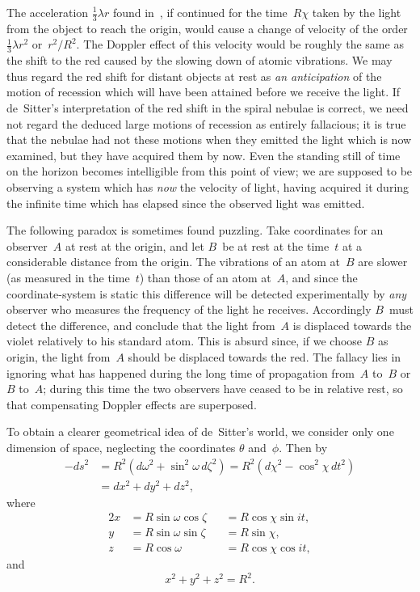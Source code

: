 \documentclass[12pt]{book}
\begin{document}
The acceleration $\frac{1}{3}\lambda r$ found in~, if continued for the time~$R\chi$ taken
by the light from the object to reach the origin, would cause a change of
velocity of the order $\frac{1}{3}\lambda r^{2}$ or~$r^{2}/R^{2}$. The Doppler effect of this velocity would
be roughly the same as the shift to the red caused by the slowing down of
atomic vibrations. We may thus regard the red shift for distant objects at
rest as \emph{an anticipation} of the motion of recession which will have been attained
before we receive the light. If de~Sitter's interpretation of the red shift in
the spiral nebulae is correct, we need not regard the deduced large motions
of recession as entirely fallacious; it is true that the nebulae had not these
motions when they emitted the light which is now examined, but they have
acquired them by now. Even the standing still of time on the horizon becomes
intelligible from this point of view; we are supposed to be observing a system
which has \emph{now} the velocity of light, having acquired it during the infinite
time which has elapsed since the observed light was emitted.

The following paradox is sometimes found puzzling. Take coordinates for
an observer~$A$ at rest at the origin, and let $B$~be at rest at the time~$t$ at a
considerable distance from the origin. The vibrations of an atom at~$B$ are
slower (as measured in the time~$t$) than those of an atom at~$A$, and since the
coordinate\hyp{}system is static this difference will be detected experimentally by
\emph{any} observer who measures the frequency of the light he receives. Accordingly
$B$~must detect the difference, and conclude that the light from~$A$ is displaced
towards the violet relatively to his standard atom. This is absurd since, if we
choose $B$ as origin, the light from~$A$ should be displaced towards the red. The
fallacy lies in ignoring what has happened during the long time of propagation
from~$A$ to~$B$ or $B$ to~$A$; during this time the two observers have ceased
to be in relative rest, so that compensating Doppler effects are superposed.

To obtain a clearer geometrical idea of de~Sitter's world, we consider only
one dimension of space, neglecting the coordinates $\theta$ and~$\phi$. Then by~
\begin{align*}
  -ds^{2} &= R^{2} (d\omega^2 + \sin^{2}\omega\, d\zeta^2)
  = R^{2} (d\chi^{2} - \cos^{2}\chi\, dt^{2}) \\
  &= dx^{2} + dy^{2} + dz^{2},
\end{align*}
where
\begin{alignat*}{2}
  x &= R\sin\omega \cos\zeta &&= R\cos\chi \sin it, \\
  y &= R\sin\omega \sin\zeta &&= R\sin\chi, \\
  z &= R\cos\omega &&= R\cos\chi \cos it,
\end{alignat*}
and
\[
x^{2} + y^{2} + z^{2} = R^{2}.
\]
\end{document}
